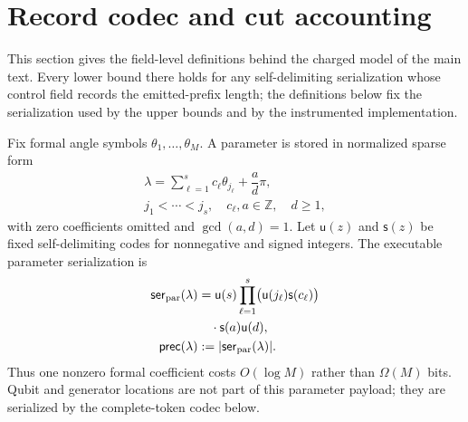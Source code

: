 \section{Record codec and cut accounting}
\label{supp:codec}

This section gives the field-level definitions behind the charged model of
the main text.  Every lower bound there holds for any self-delimiting
serialization whose control field records the emitted-prefix length; the
definitions below fix the serialization used by the upper bounds and by
the instrumented implementation.

\begin{definition}
\label{def:parmodule}
Fix formal angle symbols $\theta_1,\ldots,\theta_M$.  A parameter is stored
in normalized sparse form
\begin{equation*}
\begin{gathered}
 \lambda=\displaystyle\sum_{\ell=1}^{s}c_\ell\theta_{j_\ell}
 +\dfrac{a}{d}\pi,\\
 j_1<\cdots<j_s,\quad c_\ell,a\in\mathbb Z,\quad d\geq1,
\end{gathered}
\end{equation*}
with zero coefficients omitted and $\gcd(a,d)=1$.  Let
$\mathsf{u}(z)$ and $\mathsf{s}(z)$ be fixed self-delimiting codes for
nonnegative and signed integers.  The executable parameter serialization is
\begin{equation}
\label{eq:precision-charge}
\begin{aligned}
 \mathsf{ser}_{\mathrm{par}}(\lambda)
 &=\mathsf{u}(s)\prod_{\ell=1}^{s}
   \bigl(\mathsf{u}(j_\ell)\mathsf{s}(c_\ell)\bigr)\\
 &\quad\cdot\mathsf{s}(a)\mathsf{u}(d),\\
 \mathsf{prec}(\lambda)&:=|\mathsf{ser}_{\mathrm{par}}(\lambda)|.
\end{aligned}
\end{equation}
Thus one nonzero formal coefficient costs $O(\log M)$ rather than
$\Omega(M)$ bits.  Qubit and generator locations are not part of this
parameter payload; they are serialized by the complete-token codec below.
\end{definition}

